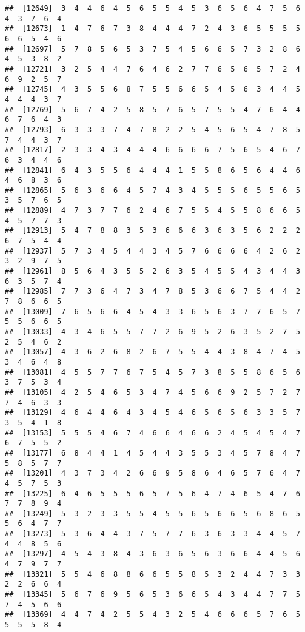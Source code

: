 \documentclass[
]{book}
\begin{document}
\begin{verbatim}
##  [12649]  3  4  4  6  4  5  6  5  5  4  5  3  6  5  6  4  7  5  6  4  3  7  6  4
##  [12673]  1  4  7  6  7  3  8  4  4  4  7  2  4  3  6  5  5  5  5  6  6  5  4  6
##  [12697]  5  7  8  5  6  5  3  7  5  4  5  6  6  5  7  3  2  8  6  4  5  3  8  2
##  [12721]  3  2  5  4  4  7  6  4  6  2  7  7  6  5  6  5  7  2  4  6  9  2  5  7
##  [12745]  4  3  5  5  6  8  7  5  5  6  6  5  4  5  6  3  4  4  5  4  4  4  3  7
##  [12769]  5  6  7  4  2  5  8  5  7  6  5  7  5  5  4  7  6  4  4  6  7  6  4  3
##  [12793]  6  3  3  3  7  4  7  8  2  2  5  4  5  6  5  4  7  8  5  7  4  4  3  7
##  [12817]  2  3  3  4  3  4  4  4  6  6  6  6  7  5  6  5  4  6  7  6  3  4  4  6
##  [12841]  6  4  3  5  5  6  4  4  4  1  5  5  8  6  5  6  4  4  6  4  6  8  3  6
##  [12865]  5  6  3  6  6  4  5  7  4  3  4  5  5  5  6  5  5  6  5  3  5  7  6  5
##  [12889]  4  7  3  7  7  6  2  4  6  7  5  5  4  5  5  8  6  6  5  4  5  7  7  3
##  [12913]  5  4  7  8  8  3  5  3  6  6  6  3  6  3  5  6  2  2  2  6  7  5  4  4
##  [12937]  5  7  3  4  5  4  4  3  4  5  7  6  6  6  6  4  2  6  2  3  2  9  7  5
##  [12961]  8  5  6  4  3  5  5  2  6  3  5  4  5  5  4  3  4  4  3  6  3  5  7  4
##  [12985]  7  7  3  6  4  7  3  4  7  8  5  3  6  6  7  5  4  4  2  7  8  6  6  5
##  [13009]  7  6  5  6  6  4  5  4  3  3  6  5  6  3  7  7  6  5  7  5  5  6  6  5
##  [13033]  4  3  4  6  5  5  7  7  2  6  9  5  2  6  3  5  2  7  5  2  5  4  6  2
##  [13057]  4  3  6  2  6  8  2  6  7  5  5  4  4  3  8  4  7  4  5  3  4  6  4  8
##  [13081]  4  5  5  7  7  6  7  5  4  5  7  3  8  5  5  8  6  5  6  3  7  5  3  4
##  [13105]  4  2  5  4  6  5  3  4  7  4  5  6  6  9  2  5  7  2  7  7  4  6  3  3
##  [13129]  4  6  4  4  6  4  3  4  5  4  6  5  6  5  6  3  3  5  7  3  5  4  1  8
##  [13153]  5  5  5  4  6  7  4  6  6  4  6  6  2  4  5  4  5  4  7  6  7  5  5  2
##  [13177]  6  8  4  4  1  4  5  4  4  3  5  5  3  4  5  7  8  4  7  5  8  5  7  7
##  [13201]  4  3  7  3  4  2  6  6  9  5  8  6  4  6  5  7  6  4  7  4  5  7  5  3
##  [13225]  6  4  6  5  5  5  6  5  7  5  6  4  7  4  6  5  4  7  6  7  7  8  9  4
##  [13249]  5  3  2  3  3  5  5  4  5  5  6  5  6  6  5  6  8  6  5  5  6  4  7  7
##  [13273]  5  3  6  4  4  3  7  5  7  7  6  3  6  3  3  4  4  5  7  4  4  8  5  6
##  [13297]  4  5  4  3  8  4  3  6  3  6  5  6  3  6  6  4  4  5  6  4  7  9  7  7
##  [13321]  5  5  4  6  8  8  6  6  5  5  8  5  3  2  4  4  7  3  3  2  2  6  6  4
##  [13345]  5  6  7  6  9  5  6  5  3  6  6  5  4  3  4  4  7  7  5  7  4  5  6  6
##  [13369]  4  4  7  4  2  5  5  4  3  2  5  4  6  6  6  5  7  6  5  5  5  5  8  4

\end{verbatim}
\end{document}
